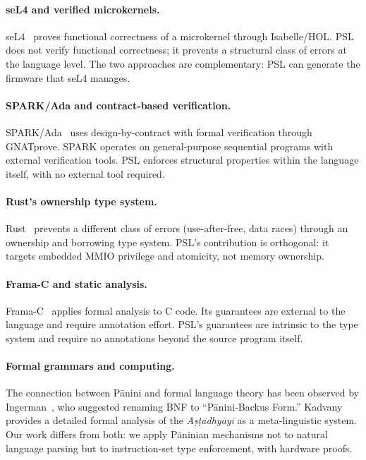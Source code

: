 \documentclass[11pt,a4paper]{article}
\begin{document}
\paragraph{seL4 and verified microkernels.}
seL4~\cite{klein2009sel4} proves functional correctness of a microkernel
through Isabelle/HOL. PSL does not verify functional correctness; it prevents
a structural class of errors at the language level. The two approaches are
complementary: PSL can generate the firmware that seL4 manages.

\paragraph{SPARK/Ada and contract-based verification.}
SPARK/Ada~\cite{mccormick2015building} uses design-by-contract with formal
verification through GNATprove. SPARK operates on general-purpose sequential
programs with external verification tools. PSL enforces structural properties
within the language itself, with no external tool required.

\paragraph{Rust's ownership type system.}
Rust~\cite{matsakis2014rust} prevents a different class of errors (use-after-free,
data races) through an ownership and borrowing type system. PSL's contribution
is orthogonal: it targets embedded MMIO privilege and atomicity, not memory
ownership.

\paragraph{Frama-C and static analysis.}
Frama-C~\cite{cuoq2012frama} applies formal analysis to C code. Its guarantees
are external to the language and require annotation effort. PSL's guarantees
are intrinsic to the type system and require no annotations beyond the source
program itself.

\paragraph{Formal grammars and computing.}
The connection between P\={a}nini and formal language theory has been observed
by Ingerman~\cite{ingerman1967panini}, who suggested renaming BNF to
``P\={a}nini-Backus Form.'' Kadvany~\cite{kadvany2016panini} provides a
detailed formal analysis of the \emph{A\d{s}\d{t}\={a}dhy\={a}y\={i}} as a
meta-linguistic system. Our work differs from both: we apply P\={a}ninian
mechanisms not to natural language parsing but to instruction-set type
enforcement, with hardware proofs.
\end{document}
